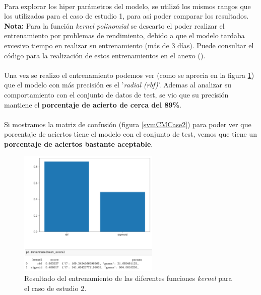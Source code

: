 {\paragraph{}
Para explorar los hiper parámetros del modelo, se utilizó los mismos rangos que los utilizados para el caso de estudio 1, para así poder comparar los resultados. \textbf{Nota:} Para la función \textit{kernel polinomial} se descarto el poder realizar el entrenamiento por problemas de rendimiento, debido a que el modelo tardaba excesivo tiempo en realizar su entrenamiento (más de 3 días). Puede consultar el código para la realización de estos entrenamientos en el anexo ().

\paragraph{}
Una vez se realizo el entrenamiento podemos ver (como se aprecia en la figura \ref{svmTrainCase2}) que el modelo con más precisión es el '\textit{radial (rbf)}'. Ademas al analizar su comportamiento con el conjunto de datos de test, se vio que su precisión mantiene el \textbf{porcentaje de acierto de cerca del 89\%}.

\paragraph{}
Si mostramos la matriz de confusión\cite{ref:confusion_matrix} (figura \ref{svmCMCase2}) para poder ver que porcentaje de aciertos tiene el modelo con el conjunto de test, vemos que tiene un \textbf{porcentaje de aciertos bastante aceptable}.

\begin{figure}[!htb]
  \centering
	    \includegraphics[width=0.6\textwidth]{images/resultados_svm_ent_conjunto2.png}
    	\caption{Resultado del entrenamiento de las diferentes funciones \textit{kernel} para el caso de estudio 2.}
	\label{svmTrainCase2}
\end{figure}

}
